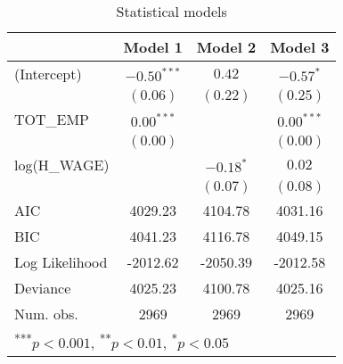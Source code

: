 

\usepackage{booktabs}
\begin{table}
\begin{center}
\begin{tabular}{l c c c }
\toprule
               & Model 1 & Model 2 & Model 3 \\
\midrule
(Intercept)    & $-0.50^{***}$ & $0.42$      & $-0.57^{*}$  \\
               & $(0.06)$      & $(0.22)$    & $(0.25)$     \\
TOT_EMP        & $0.00^{***}$  &             & $0.00^{***}$ \\
               & $(0.00)$      &             & $(0.00)$     \\
log(H_WAGE)    &               & $-0.18^{*}$ & $0.02$       \\
               &               & $(0.07)$    & $(0.08)$     \\
\midrule
AIC            & 4029.23       & 4104.78     & 4031.16      \\
BIC            & 4041.23       & 4116.78     & 4049.15      \\
Log Likelihood & -2012.62      & -2050.39    & -2012.58     \\
Deviance       & 4025.23       & 4100.78     & 4025.16      \\
Num. obs.      & 2969          & 2969        & 2969         \\
\bottomrule
\multicolumn{4}{l}{\scriptsize{\textsuperscript{***}$p<0.001$, 
  \textsuperscript{**}$p<0.01$, 
  \textsuperscript{*}$p<0.05$}}
\end{tabular}
\caption{Statistical models}
\label{table:coefficients}
\end{center}
\end{table}

